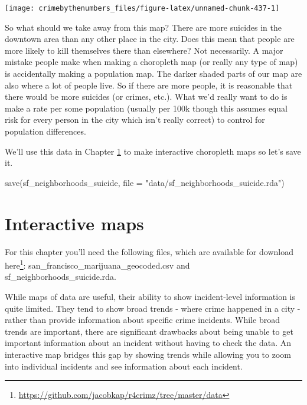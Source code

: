 \documentclass[
  a4paper,
]{krantz}
\makeatletter
\newenvironment{Shaded}{\begin{snugshade}}{\end{snugshade}}
\newcommand{\AttributeTok}[1]{\textcolor[rgb]{0.61,0.61,0.61}{#1}}
\newcommand{\FunctionTok}[1]{\textcolor[rgb]{0,0,0}{#1}}
\newcommand{\NormalTok}[1]{#1}
\newcommand{\StringTok}[1]{\textcolor[rgb]{0.5,0.5,0.5}{#1}}
\renewcommand{\href}[2]{#2\footnote{\url{#1}}}
\newenvironment{kframe}{%
\medskip{}
\setlength{\fboxsep}{.8em}
 \def\at@end@of@kframe{}%
 \ifinner\ifhmode%
  \def\at@end@of@kframe{\end{minipage}}%
  \begin{minipage}{\columnwidth}%
 \fi\fi%
 \def\FrameCommand##1{\hskip\@totalleftmargin \hskip-\fboxsep
 \colorbox{shadecolor}{##1}\hskip-\fboxsep
     \hskip-\linewidth \hskip-\@totalleftmargin \hskip\columnwidth}%
 \MakeFramed {\advance\hsize-\width
   \@totalleftmargin\z@ \linewidth\hsize
   \@setminipage}}%
 {\par\unskip\endMakeFramed%
 \at@end@of@kframe}
\renewenvironment{Shaded}{\begin{kframe}}{\end{kframe}}
\makeatother
\begin{document}
\begin{center}\texttt{[image: crimebythenumbers\_files/figure-latex/unnamed-chunk-437-1]} \end{center}

So what should we take away from this map? There are more
suicides in the downtown area than any other place in the
city. Does this mean that people are more likely to kill
themselves there than elsewhere? Not necessarily. A major
mistake people make when making a choropleth map (or really
any type of map) is accidentally making a population map.
The darker shaded parts of our map are also where a lot of
people live. So if there are more people, it is reasonable
that there would be more suicides (or crimes, etc.). What
we'd really want to do is make a rate per some population
(usually per 100k though this assumes equal risk for every
person in the city which isn't really correct) to control
for population differences.

We'll use this data in Chapter \ref{interactive-maps} to
make interactive choropleth maps so let's save it.

\begin{Shaded}
\begin{Highlighting}[]
\FunctionTok{save}\NormalTok{(sf\_neighborhoods\_suicide, }\AttributeTok{file =} \StringTok{"data/sf\_neighborhoods\_suicide.rda"}\NormalTok{)}
\end{Highlighting}
\end{Shaded}

\hypertarget{interactive-maps}{%
\chapter{Interactive maps}\label{interactive-maps}}

For this chapter you'll need the following files, which are
available for download
\href{https://github.com/jacobkap/r4crimz/tree/master/data}{here}:
san\_francisco\_marijuana\_geocoded.csv and
sf\_neighborhoods\_suicide.rda.

While maps of data are useful, their ability to show
incident-level information is quite limited. They tend to
show broad trends - where crime happened in a city - rather
than provide information about specific crime incidents.
While broad trends are important, there are significant
drawbacks about being unable to get important information
about an incident without having to check the data. An
interactive map bridges this gap by showing trends while
allowing you to zoom into individual incidents and see
information about each incident.
\end{document}
